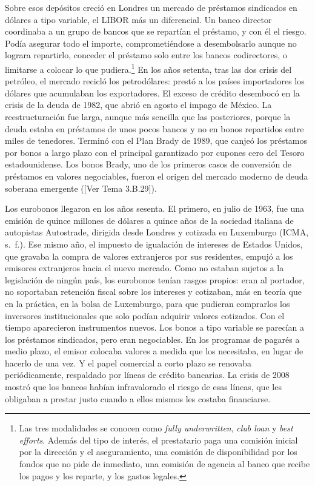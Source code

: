\documentclass[10pt,a4paper]{article}
\newcommand{\authorfont}[1]{{\fontfamily{EBGaramond-TLF}\selectfont #1}}
\begin{document}
Sobre esos depósitos creció en Londres un mercado de préstamos sindicados en dólares a tipo variable, el LIBOR más un diferencial. Un banco director coordinaba a un grupo de bancos que se repartían el préstamo, y con él el riesgo. Podía asegurar todo el importe, comprometiéndose a desembolsarlo aunque no lograra repartirlo, conceder el préstamo solo entre los bancos codirectores, o limitarse a colocar lo que pudiera.\footnote{%
    Las tres modalidades se conocen como \textit{fully underwritten}, \textit{club loan} y \textit{best efforts}. Además del tipo de interés, el prestatario paga una comisión inicial por la dirección y el aseguramiento, una comisión de disponibilidad por los fondos que no pide de inmediato, una comisión de agencia al banco que recibe los pagos y los reparte, y los gastos legales.
} En los años setenta, tras las dos crisis del petróleo, el mercado recicló los petrodólares: prestó a los países importadores los dólares que acumulaban los exportadores. El exceso de crédito desembocó en la crisis de la deuda de 1982, que abrió en agosto el impago de México. La reestructuración fue larga, aunque más sencilla que las posteriores, porque la deuda estaba en préstamos de unos pocos bancos y no en bonos repartidos entre miles de tenedores. Terminó con el Plan Brady de 1989, que canjeó los préstamos por bonos a largo plazo con el principal garantizado por cupones cero del Tesoro estadounidense. Los bonos Brady, uno de los primeros casos de conversión de préstamos en valores negociables, fueron el origen del mercado moderno de deuda soberana emergente ([\authorfont{Ver Tema 3.B.29}]).

Los eurobonos llegaron en los años sesenta. El primero, en julio de 1963, fue una emisión de quince millones de dólares a quince años de la sociedad italiana de autopistas Autostrade, dirigida desde Londres y cotizada en Luxemburgo (ICMA, s.~f.). Ese mismo año, el impuesto de igualación de intereses de Estados Unidos, que gravaba la compra de valores extranjeros por sus residentes, empujó a los emisores extranjeros hacia el nuevo mercado. Como no estaban sujetos a la legislación de ningún país, los eurobonos tenían rasgos propios: eran al portador, no soportaban retención fiscal sobre los intereses y cotizaban, más en teoría que en la práctica, en la bolsa de Luxemburgo, para que pudieran comprarlos los inversores institucionales que solo podían adquirir valores cotizados. Con el tiempo aparecieron instrumentos nuevos. Los bonos a tipo variable se parecían a los préstamos sindicados, pero eran negociables. En los programas de pagarés a medio plazo, el emisor colocaba valores a medida que los necesitaba, en lugar de hacerlo de una vez. Y el papel comercial a corto plazo se renovaba periódicamente, respaldado por líneas de crédito bancarias. La crisis de 2008 mostró que los bancos habían infravalorado el riesgo de esas líneas, que les obligaban a prestar justo cuando a ellos mismos les costaba financiarse.
\end{document}
